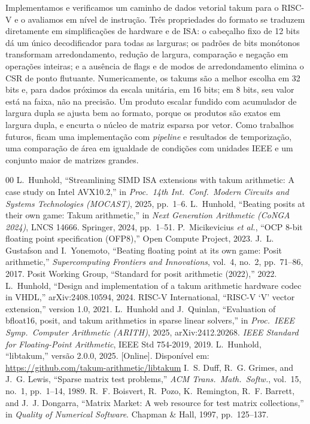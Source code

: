 \documentclass[conference]{IEEEtran}
\begin{document}
Implementamos e verificamos um caminho de dados vetorial takum para o RISC-V e o avaliamos em nível de
instrução. Três propriedades do formato se traduzem diretamente em simplificações de hardware e de ISA: o
cabeçalho fixo de 12 bits dá um único decodificador para todas as larguras; os padrões de bits monótonos
transformam arredondamento, redução de largura, comparação e negação em operações inteiras; e a ausência
de flags e de modos de arredondamento elimina o CSR de ponto flutuante. Numericamente, os takums são a
melhor escolha em 32 bits e, para dados próximos da escala unitária, em 16 bits; em 8 bits, seu valor está
na faixa, não na precisão. Um produto escalar fundido com acumulador de largura dupla se ajusta bem ao
formato, porque os produtos são exatos em largura dupla, e encurta o núcleo de matriz esparsa por vetor.
Como trabalhos futuros, ficam uma implementação com \emph{pipeline} e resultados de temporização, uma
comparação de área em igualdade de condições com unidades IEEE e um conjunto maior de matrizes grandes.

\begin{thebibliography}{00}
 L.~Hunhold, ``Streamlining SIMD ISA extensions with takum arithmetic: A case
study on Intel AVX10.2,'' in \emph{Proc.\ 14th Int.\ Conf.\ Modern Circuits and Systems Technologies
(MOCAST)}, 2025, pp.~1--6.
 L.~Hunhold, ``Beating posits at their own game: Takum arithmetic,'' in
\emph{Next Generation Arithmetic (CoNGA 2024)}, LNCS 14666. Springer, 2024, pp.~1--51.
 P.~Micikevicius \emph{et al.}, ``OCP 8-bit floating point specification (OFP8),'' Open
Compute Project, 2023.
 J.~L. Gustafson and I.~Yonemoto, ``Beating floating point at its own game:
Posit arithmetic,'' \emph{Supercomputing Frontiers and Innovations}, vol.~4, no.~2, pp.~71--86, 2017.
 Posit Working Group, ``Standard for posit arithmetic (2022),'' 2022.
 L.~Hunhold, ``Design and implementation of a takum arithmetic hardware codec
in VHDL,'' arXiv:2408.10594, 2024.
 RISC-V International, ``RISC-V `V' vector extension,'' version 1.0, 2021.
 L.~Hunhold and J.~Quinlan, ``Evaluation of bfloat16, posit, and takum
arithmetics in sparse linear solvers,'' in \emph{Proc.\ IEEE Symp.\ Computer Arithmetic (ARITH)}, 2025,
arXiv:2412.20268.
 \emph{IEEE Standard for Floating-Point Arithmetic}, IEEE Std 754-2019, 2019.
 L.~Hunhold, ``libtakum,'' versão 2.0.0, 2025. [Online]. Disponível em:
\url{https://github.com/takum-arithmetic/libtakum}
 I.~S. Duff, R.~G. Grimes, and J.~G. Lewis, ``Sparse matrix test problems,''
\emph{ACM Trans.\ Math.\ Softw.}, vol.~15, no.~1, pp.~1--14, 1989.
 R.~F. Boisvert, R.~Pozo, K.~Remington, R.~F. Barrett, and J.~J. Dongarra, ``Matrix
Market: A web resource for test matrix collections,'' in \emph{Quality of Numerical Software}.
Chapman \& Hall, 1997, pp.~125--137.
\end{thebibliography}
\end{document}
